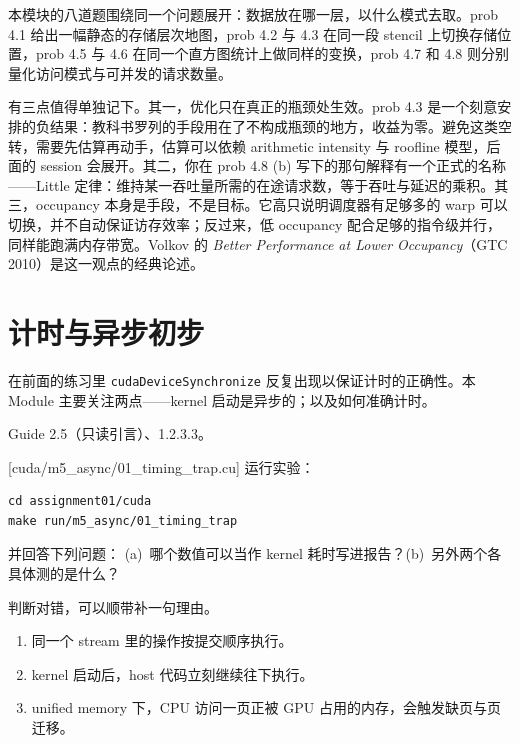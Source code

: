 \documentclass[11pt,a4paper,fontset=none]{ctexart}
\begin{document}
\begin{lookback}
本模块的八道题围绕同一个问题展开：数据放在哪一层，以什么模式去取。prob 4.1 给出一幅静态的存储层次地图，prob 4.2 与 4.3 在同一段 stencil 上切换存储位置，prob 4.5 与 4.6 在同一个直方图统计上做同样的变换，prob 4.7 和 4.8 则分别量化访问模式与可并发的请求数量。

有三点值得单独记下。其一，优化只在真正的瓶颈处生效。prob 4.3 是一个刻意安排的负结果：教科书罗列的手段用在了不构成瓶颈的地方，收益为零。避免这类空转，需要先估算再动手，估算可以依赖 arithmetic intensity 与 roofline 模型，后面的 session 会展开。其二，你在 prob 4.8 (b) 写下的那句解释有一个正式的名称——Little 定律：维持某一吞吐量所需的在途请求数，等于吞吐与延迟的乘积。其三，occupancy 本身是手段，不是目标。它高只说明调度器有足够多的 warp 可以切换，并不自动保证访存效率；反过来，低 occupancy 配合足够的指令级并行，同样能跑满内存带宽。Volkov 的 \textit{Better Performance at Lower Occupancy}（GTC 2010）是这一观点的经典论述。
\end{lookback}

\section{计时与异步初步}

在前面的练习里 \texttt{cudaDeviceSynchronize} 反复出现以保证计时的正确性。本 Module 主要关注两点——kernel 启动是异步的；以及如何准确计时。

\begin{reading}
Guide 2.5（只读引言）、1.2.3.3。
\end{reading}

[cuda/m5\_async/01\_timing\_trap.cu]
运行实验：

\begin{lstlisting}
cd assignment01/cuda
make run/m5_async/01_timing_trap
\end{lstlisting}

并回答下列问题：
(a)~哪个数值可以当作 kernel 耗时写进报告？(b)~另外两个各具体测的是什么？

判断对错，可以顺带补一句理由。
\begin{enumerate}[label=(\alph*)]
  \item 同一个 stream 里的操作按提交顺序执行。
  \item kernel 启动后，host 代码立刻继续往下执行。
  \item unified memory 下，CPU 访问一页正被 GPU 占用的内存，会触发缺页与页迁移。
\end{enumerate}
\end{document}
